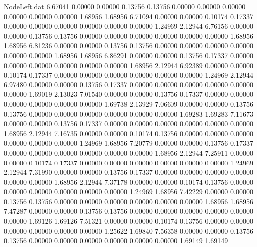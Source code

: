 \begin{filecontents}{NodeLeft.dat}
   6.67041    0.00000    0.00000     0.13756    0.13756    0.00000    0.00000    0.00000    0.00000    0.00000    0.00000    1.68956    1.68956
   6.71094    0.00000    0.00000     0.10174    0.17337    0.00000    0.00000    0.00000    0.00000    0.00000    0.00000    1.24969    2.12944
   6.76156    0.00000    0.00000     0.13756    0.13756    0.00000    0.00000    0.00000    0.00000    0.00000    0.00000    1.68956    1.68956
   6.81236    0.00000    0.00000     0.13756    0.13756    0.00000    0.00000    0.00000    0.00000    0.00000    0.00000    1.68956    1.68956
   6.86291    0.00000    0.00000     0.13756    0.17337    0.00000    0.00000    0.00000    0.00000    0.00000    0.00000    1.68956    2.12944
   6.92389    0.00000    0.00000     0.10174    0.17337    0.00000    0.00000    0.00000    0.00000    0.00000    0.00000    1.24969    2.12944
   6.97480    0.00000    0.00000     0.13756    0.17337    0.00000    0.00000    0.00000    0.00000    0.00000    0.00000    1.69019    2.13023
   7.01540    0.00000    0.00000     0.13756    0.17337    0.00000    0.00000    0.00000    0.00000    0.00000    0.00000    1.69738    2.13929
   7.06609    0.00000    0.00000     0.13756    0.13756    0.00000    0.00000    0.00000    0.00000    0.00000    0.00000    1.69283    1.69283
   7.11673    0.00000    0.00000     0.13756    0.17337    0.00000    0.00000    0.00000    0.00000    0.00000    0.00000    1.68956    2.12944
   7.16735    0.00000    0.00000     0.10174    0.13756    0.00000    0.00000    0.00000    0.00000    0.00000    0.00000    1.24969    1.68956
   7.20779    0.00000    0.00000     0.13756    0.17337    0.00000    0.00000    0.00000    0.00000    0.00000    0.00000    1.68956    2.12944
   7.25911    0.00000    0.00000     0.10174    0.17337    0.00000    0.00000    0.00000    0.00000    0.00000    0.00000    1.24969    2.12944
   7.31990    0.00000    0.00000     0.13756    0.17337    0.00000    0.00000    0.00000    0.00000    0.00000    0.00000    1.68956    2.12944
   7.37178    0.00000    0.00000     0.10174    0.13756    0.00000    0.00000    0.00000    0.00000    0.00000    0.00000    1.24969    1.68956
   7.42229    0.00000    0.00000     0.13756    0.13756    0.00000    0.00000    0.00000    0.00000    0.00000    0.00000    1.68956    1.68956
   7.47287    0.00000    0.00000     0.13756    0.13756    0.00000    0.00000    0.00000    0.00000    0.00000    0.00000    1.69126    1.69126
   7.51321    0.00000    0.00000     0.10174    0.13756    0.00000    0.00000    0.00000    0.00000    0.00000    0.00000    1.25622    1.69840
   7.56358    0.00000    0.00000     0.13756    0.13756    0.00000    0.00000    0.00000    0.00000    0.00000    0.00000    1.69149    1.69149

\end{filecontents}
